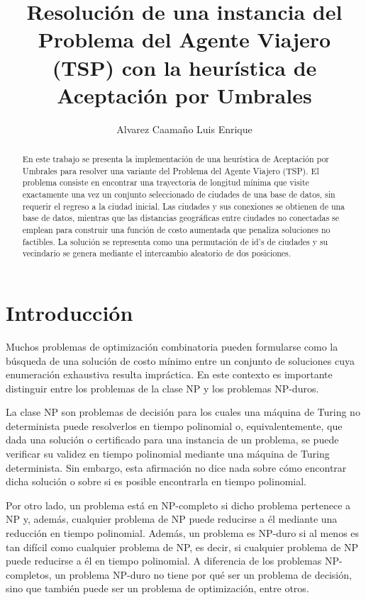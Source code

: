 \documentclass[11pt,a4paper]{article}
\title{Resolución de una instancia del Problema del Agente Viajero (TSP) con la heurística de Aceptación por Umbrales}
\author{Alvarez Caamaño Luis Enrique}
\date{}
\begin{document}
\maketitle

\begin{abstract}
En este trabajo se presenta la implementación de una heurística de
Aceptación por Umbrales para resolver una variante del Problema del
Agente Viajero (TSP). El problema consiste en encontrar una
trayectoria de longitud mínima que visite exactamente una vez un
conjunto seleccionado de ciudades de una base de datos, sin requerir
el regreso a la ciudad inicial. Las ciudades y sus conexiones se
obtienen de una base de datos, mientras que las distancias geográficas
entre ciudades no conectadas se emplean para construir una función de
costo aumentada que penaliza soluciones no factibles. La solución se
representa como una permutación de id's de ciudades y su vecindario se
genera mediante el intercambio aleatorio de dos posiciones.
\end{abstract}

\section{Introducción}





Muchos problemas de optimización combinatoria pueden formularse como
la búsqueda de una solución de costo mínimo entre un conjunto de
soluciones cuya enumeración exhaustiva resulta impráctica. En este
contexto es importante distinguir entre los problemas de la clase NP y
los problemas NP-duros.


La clase NP son problemas de decisión para los cuales una máquina de
Turing no determinista puede resolverlos en tiempo polinomial o,
equivalentemente, que dada una solución o certificado para una
instancia de un problema, se puede verificar su validez en tiempo
polinomial mediante una máquina de Turing determinista. Sin embargo,
esta afirmación no dice nada sobre cómo encontrar dicha solución o
sobre si es posible encontrarla en tiempo polinomial.

Por otro lado, un problema está en NP-completo si dicho problema
pertenece a NP y, además, cualquier problema de NP puede reducirse a
él mediante una reducción en tiempo polinomial. Además, un problema es
NP-duro si al menos es tan difícil como cualquier problema de NP, es
decir, si cualquier problema de NP puede reducirse a él en tiempo
polinomial. A diferencia de los problemas NP-completos, un problema
NP-duro no tiene por qué ser un problema de decisión, sino que también
puede ser un problema de optimización, entre otros.
\end{document}
